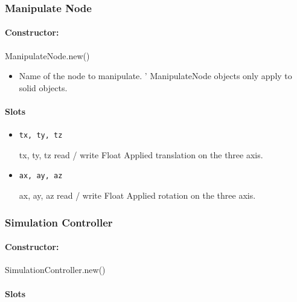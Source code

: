 \subsubsection{Manipulate Node}

\paragraph{Constructor:} ManipulateNode.new()

\begin{itemize}
\item {} Name of the \webots node to
  manipulate. \webots' ManipulateNode objects only apply to solid
  objects.
\end{itemize}

\paragraph{Slots}

\begin{itemize}
\item \lstinline{tx, ty, tz}
\begin{attribute}{tx, ty, tz}
  {read / write}
  {Float}
  {}
  Applied translation on the three axis.
\end{attribute}
\item \lstinline{ax, ay, az}
\begin{attribute}{ax, ay, az}
  {read / write}
  {Float}
  {}
  Applied rotation on the three axis.
\end{attribute}
\end{itemize}

\subsubsection{Simulation Controller}

\paragraph{Constructor:} SimulationController.new()

\paragraph{Slots}

